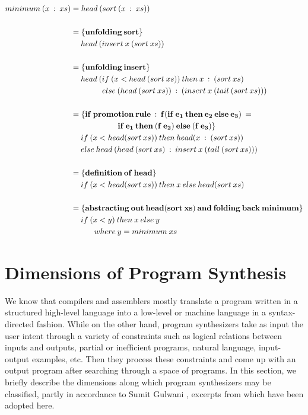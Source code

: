 \vspace{1em}
\begin{align*}
minimum\: (x\: :\: xs)
            &= head\: (sort\: (x\: :\: xs)) \\\\
 			&= \{\bf{unfolding}\: sort\} \\
 			   &\quad \; head\: (insert\: x\: (sort\: xs)) \\\\
 			&= \{\bf{unfolding}\: insert\} \\
 			   &\quad \; head\: (if\: (x < head\: (sort\: xs))\: then\: x\: :\: (sort\: xs) \\
 			   &\quad \quad \quad \quad else\: (head\: (sort\: xs))\: :\: (insert\: x\: (tail\: (sort\: xs))) \\\\
 			&= \{\bf{if\: promotion\: rule}\: :\: f(if\: e_1\: then\: e_2\: else\: e_3)\: =\\
 			   &\qquad \qquad \qquad \bf{if}\: e_1\: then\: (f\: e_2)\: else\: (f\: e_3)\} \\
 			   &\quad \; if\: (x < head(sort\: xs))\: then\: head(x\: :\: (sort\: xs)) \\
 			   &\quad \; else\: head\: (head\: (sort\: xs)\: :\: insert\: x\: (tail\: (sort\: xs))) \\\\
 			&= \{\bf{definition\: of\: head}\} \\
 			   &\quad \; if\: (x < head(sort\: xs))\: then\: x\: else\: head(sort\: xs) \\\\
 			&= \{\bf{abstracting\: out\: head(sort\: xs)\: and\: folding\: back\: minimum}\} \\
 			   &\quad \; if\: (x < y)\: then\: x\: else\: y\\
 			   &\quad \quad \quad where\: y = minimum\: xs
\end{align*}

\section{Dimensions of Program Synthesis}
We know that compilers and assemblers mostly translate a program written in a structured high-level language into a low-level or machine language in a syntax-directed fashion. While on the other hand, program synthesizers take as input the user intent through a variety of constraints such as logical relations between inputs and outputs, partial or inefficient programs, natural language, input-output examples, etc. Then they process these constraints and come up with an output program after searching through a space of programs. In this section, we briefly describe the dimensions along which program synthesizers may be classified, partly in accordance to Sumit Gulwani \cite{gulwani2010dimensions}, excerpts from which have been adopted here.

